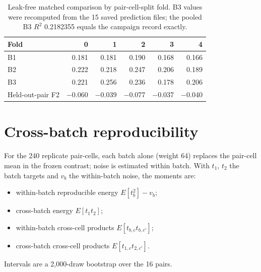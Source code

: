 \documentclass[11pt]{article}
\begin{document}
\begin{table}[htbp]
\caption{Leak-free matched comparison by pair-cell-split fold. B3 values were recomputed from the 15 saved prediction files; the pooled B3 $R^2$ 0.2182355 equals the campaign record exactly.}\label{tab:S7}
\centering\small
\begin{tabularx}{0.75\linewidth}{@{}L r r r r r@{}}
\toprule
Fold & 0 & 1 & 2 & 3 & 4 \\
\midrule
B1 & 0.181 & 0.181 & 0.190 & 0.168 & 0.166 \\
B2 & 0.222 & 0.218 & 0.247 & 0.206 & 0.189 \\
B3 & 0.221 & 0.256 & 0.236 & 0.178 & 0.206 \\
Held-out-pair F2 & −0.060 & −0.039 & −0.077 & −0.037 & −0.040 \\
\bottomrule
\end{tabularx}
\end{table}

\section{Cross-batch reproducibility}\label{sec:S6}
For the 240 replicate pair-cells, each batch alone (weight 64) replaces the pair-cell mean in the frozen contrast; noise is estimated within batch. With $t_1$, $t_2$ the batch targets and $v_b$ the within-batch noise, the moments are:

\begin{itemize}
\item within-batch reproducible energy $E[t_b^2]-v_b$;
\item cross-batch energy $E[t_1t_2]$;
\item within-batch cross-cell products $E[t_{b,c}t_{b,c'}]$;
\item cross-batch cross-cell products $E[t_{1,c}t_{2,c'}]$.
\end{itemize}
Intervals are a 2,000-draw bootstrap over the 16 pairs.
\end{document}
